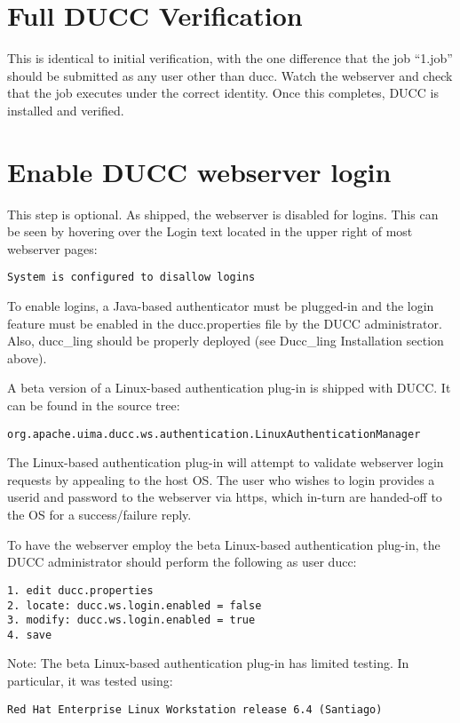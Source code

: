  
\section{Full DUCC Verification}

This is identical to initial verification, with the one difference that the job ``1.job'' should be
submitted as any user other than ducc.  Watch the webserver and check that the job executes
under the correct identity.  Once this completes, DUCC is installed and verified.
 
\section{Enable DUCC webserver login}

    This step is optional.  As shipped, the webserver is disabled for
    logins.  This can be seen by hovering over the Login text located in the
    upper right of most webserver pages: 
\begin{verbatim}
System is configured to disallow logins
\end{verbatim}

    To enable logins, a Java-based authenticator must be plugged-in and the
    login feature must be enabled in the ducc.properties file by the DUCC
    administrator.  Also, ducc\_ling should be properly deployed (see 
    Ducc\_ling Installation section above).
    
    A beta version of a Linux-based authentication plug-in is shipped with DUCC.
    It can be found in the source tree:
\begin{verbatim}
org.apache.uima.ducc.ws.authentication.LinuxAuthenticationManager
\end{verbatim}

    The Linux-based authentication plug-in will attempt to validate webserver
    login requests by appealing to the host OS.  The user who wishes to
    login provides a userid and password to the webserver via https, which
    in-turn are handed-off to the OS for a success/failure reply.
    
    To have the webserver employ the beta Linux-based authentication plug-in,
    the DUCC administrator should perform the following as user ducc:
\begin{verbatim}    
1. edit ducc.properties
2. locate: ducc.ws.login.enabled = false
3. modify: ducc.ws.login.enabled = true
4. save
\end{verbatim}

    Note: The beta Linux-based authentication plug-in has limited testing.
    In particular, it was tested using:
\begin{verbatim}
Red Hat Enterprise Linux Workstation release 6.4 (Santiago)
\end{verbatim}    
    

